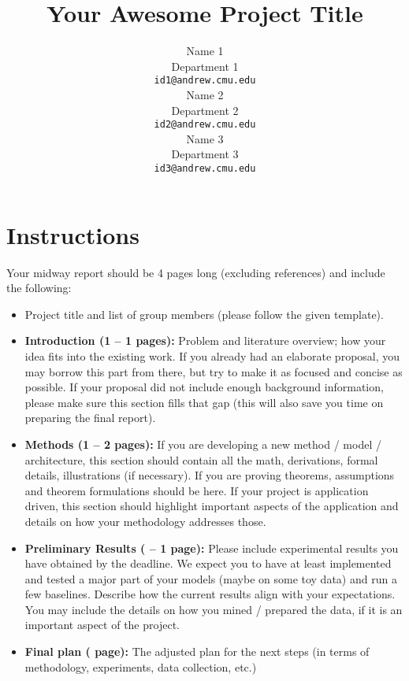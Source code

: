 \documentclass{article}
\title{Your Awesome Project Title}
\author{
  Name 1\\
  Department 1\\
  \texttt{id1@andrew.cmu.edu} \\
  \And
  Name 2 \\
  Department 2\\
  \texttt{id2@andrew.cmu.edu} \\
  \And
  Name 3\\
  Department 3\\
  \texttt{id3@andrew.cmu.edu} \\
}
\begin{document}
\maketitle


\section*{Instructions}

Your midway report should be 4 pages long (excluding references) and include the following:

\begin{itemize}[leftmargin=2em]
    \item Project title and list of group members (please follow the given template).

    \item \textbf{Introduction (1 -- 1 pages):}
    Problem and literature overview; how your idea fits into the existing work.
    If you already had an elaborate proposal, you may borrow this part from there, but try to make it as focused and concise as possible.
    If your proposal did not include enough background information, please make sure this section fills that gap (this will also save you time on preparing the final report).

    \item \textbf{Methods (1 -- 2 pages):}
    If you are developing a new method / model / architecture, this section should contain all the math, derivations, formal details, illustrations (if necessary).
    If you are proving theorems, assumptions and theorem formulations should be here.
    If your project is application driven, this section should highlight important aspects of the application and details on how your methodology addresses those.

    \item \textbf{Preliminary Results ( -- 1 page):}
    Please include experimental results you have obtained by the deadline.
    We expect you to have at least implemented and tested a major part of your models (maybe on some toy data) and run a few baselines.
    Describe how the current results align with your expectations.
    You may include the details on how you mined / prepared the data, if it is an important aspect of the project.

    \item \textbf{Final plan ( page):}
    The adjusted plan for the next steps (in terms of methodology, experiments, data collection, etc.)
\end{itemize}
\end{document}
